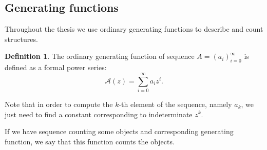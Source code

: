\documentclass[final]{article}
\theoremstyle{definition}
\newtheorem{definition}{Definition}[subsection]
\theoremstyle{remark}
\newcommand{\gf}[1]{\ensuremath{\mathcal{#1}}}
\begin{document}
\subsection{Generating functions}%
\label{sub:generating_functions}

Throughout the thesis we use ordinary generating functions to describe and count structures.

\begin{definition}
The ordinary generating function of sequence \(A = (a_i)_{i=0}^{\infty}\) is defined as a formal power series:
\[\gf{A}(z) = \sum_{i=0}^{\infty} a_i z^i .\]
\end{definition}

Note that in order to compute the \(k\)-th element of the sequence, namely \(a_k\), we just need to find a constant corresponding to indeterminate \(z^k\).

If we have sequence counting some objects and corresponding generating function, we say that this function counts the objects.
\end{document}
